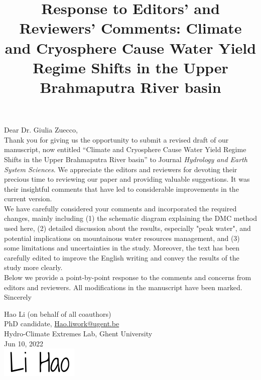 \documentclass[11pt]{article}
\title{\raggedright {Response to Editors' and Reviewers' Comments:}
{\textbf{Climate and Cryosphere Cause Water Yield Regime Shifts in the Upper Brahmaputra River basin}}}
\newcounter{reviewer}
\newcounter{point}[reviewer]
\begin{document}
\date{}
\author{}
\maketitle

Dear Dr. Giulia Zuecco, \\

Thank you for giving us the opportunity to submit a revised draft of our manuscript, now entitled “Climate and Cryosphere Cause Water Yield Regime Shifts in the Upper Brahmaputra River basin” to Journal \textit{Hydrology and Earth System Sciences}. 
We appreciate the editors and reviewers for devoting their precious time to reviewing our paper and providing valuable suggestions. It was their insightful comments that have led to considerable improvements in the current version. \\

We have carefully considered your comments and incorporated the required changes, mainly including
(1) the schematic diagram explaining the DMC method used here, 
(2) detailed discussion about the results, especially "peak water", and potential implications on mountainous water resources management, and
(3) some limitations and uncertainties in the study. 
Moreover, the text has been carefully edited to improve the English writing and convey the results of the study more clearly. \\

Below we provide a point-by-point response to the comments and concerns from editors and reviewers. All modifications in the manuscript have been marked. \\

Sincerely

\begin{flushleft}
Hao Li (on behalf of all coauthors)  \\
PhD candidate, \url{Hao.liwork@ugent.be} \\
Hydro-Climate Extremes Lab, Ghent University \\
Jun 10, 2022 \\
\includegraphics[width=.15\textwidth]{02-figures/signature.png} \par
\end{flushleft}
\end{document}
